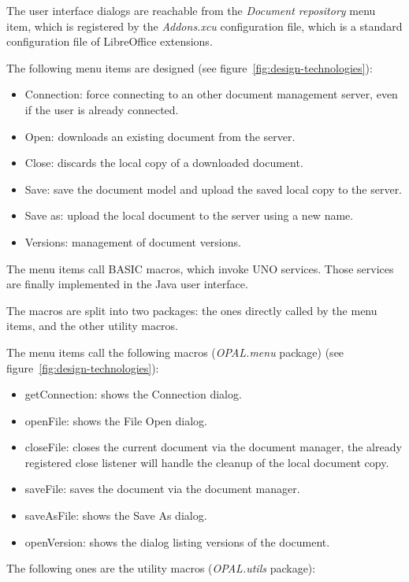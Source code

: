 The user interface dialogs are reachable from the \emph{Document repository}
menu item, which is registered by the \emph{Addons.xcu} configuration file,
which is a standard configuration file of LibreOffice extensions.

The following menu items are designed (see figure~\ref{fig:design-technologies}):

\begin{itemize}
\item Connection: force connecting to an other document management server, even
if the user is already connected.
\item Open: downloads an existing document from the server.
\item Close: discards the local copy of a downloaded document.
\item Save: save the document model and upload the saved local copy to the server.
\item Save as: upload the local document to the server using a new name.
\item Versions: management of document versions.
\end{itemize}

The menu items call BASIC macros, which invoke UNO services. Those services are
finally implemented in the Java user interface.

The macros are split into two packages: the ones directly called by the menu
items, and the other utility macros.

The menu items call the following macros (\emph{OPAL.menu} package) (see figure~\ref{fig:design-technologies}):

\begin{itemize}
\item getConnection: shows the Connection dialog.
\item openFile: shows the File Open dialog.
\item closeFile: closes the current document via the document manager, the
already registered close listener will handle the cleanup of the local document
copy.
\item saveFile: saves the document via the document manager.
\item saveAsFile: shows the Save As dialog.
\item openVersion: shows the dialog listing versions of the document.
\end{itemize}

The following ones are the utility macros (\emph{OPAL.utils} package):

